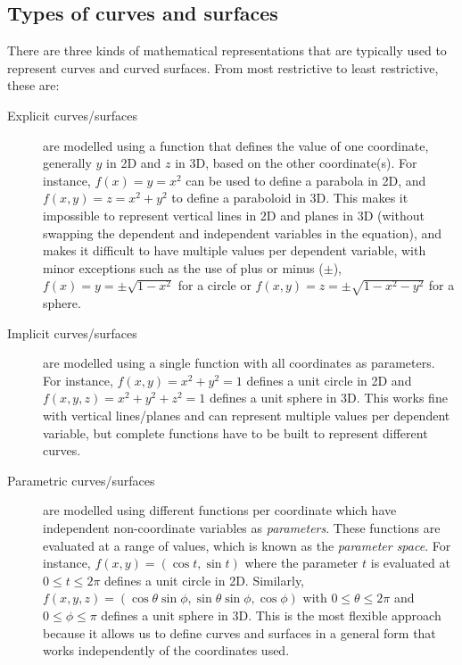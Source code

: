 \subsection{Types of curves and surfaces}

There are three kinds of mathematical representations that are typically used to represent curves and curved surfaces.
From most restrictive to least restrictive, these are:

\begin{description}
\item[Explicit curves/surfaces] are modelled using a function that defines the value of one coordinate, generally \(y\) in 2D and \(z\) in 3D, based on the other coordinate(s).
For instance, \(f(x)=y=x^2\) can be used to define a parabola in 2D, and \(f(x,y)=z=x^2+y^2\) to define a paraboloid in 3D.
This makes it impossible to represent vertical lines in 2D and planes in 3D (without swapping the dependent and independent variables in the equation), and makes it difficult to have multiple values per dependent variable, with minor exceptions such as the use of plus or minus (\(\pm\)), \eg\ \(f(x)=y = \pm\sqrt{1-x^2}\) for a circle or \(f(x,y)=z = \pm\sqrt{1-x^2-y^2}\) for a sphere.

\item[Implicit curves/surfaces] are modelled using a single function with all coordinates as parameters.
For instance, \(f(x,y) = x^2+y^2=1\) defines a unit circle in 2D and \(f(x,y,z)=x^2+y^2+z^2=1\) defines a unit sphere in 3D.
This works fine with vertical lines/planes and can represent multiple values per dependent variable, but complete functions have to be built to represent different curves.

\item[Parametric curves/surfaces] are modelled using different functions per coordinate which have independent non-coordinate variables as \emph{parameters}.
These functions are evaluated at a range of values, which is known as the \emph{parameter space}.
For instance, \(f(x,y) = (\cos t, \sin t)\) where the parameter \(t\) is evaluated at \(0 \leq t \leq 2\pi \) defines a unit circle in 2D.
Similarly, \(f(x,y,z) = (\cos \theta \sin \phi , \sin \theta \sin \phi, \cos \phi)\) with \(0 \leq \theta \leq 2\pi \) and \(0 \leq \phi \leq \pi \) defines a unit sphere in 3D.
This is the most flexible approach because it allows us to define curves and surfaces in a general form that works independently of the coordinates used. 
\end{description}

